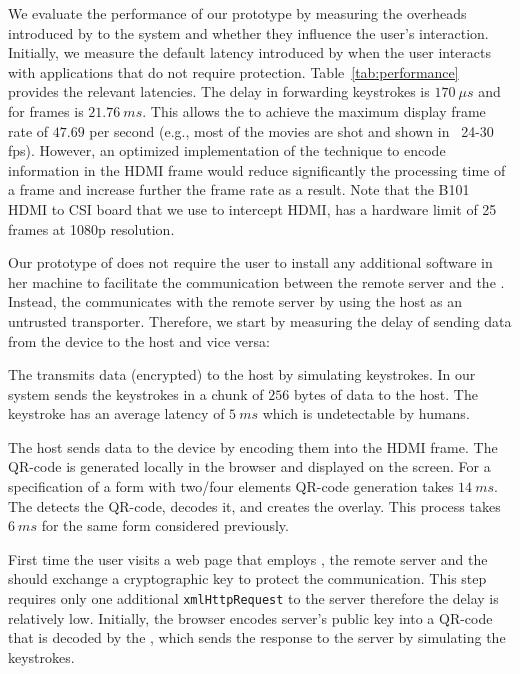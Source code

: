 We evaluate the performance of our prototype by measuring the overheads introduced by \name to the system and whether they influence the user's interaction. Initially, we measure the default latency introduced by \device when the user interacts with applications that do not require protection. Table~\ref{tab:performance} provides the relevant latencies.
The delay in forwarding keystrokes is $170\ \mu s$ and for frames is $21.76\ ms$. This allows the \device to achieve the maximum display frame rate of $47.69$ per second (e.g., most of the movies are shot and shown in  ~24-30 fps). However, an optimized implementation of the technique to encode information in the HDMI frame would reduce significantly the processing time of a frame and increase further the frame rate as a result. Note that the B101 HDMI to CSI board that we use to intercept HDMI, has a hardware limit of 25 frames at 1080p resolution.

Our prototype of \name does not require the user to install any additional software in her machine to facilitate the communication between the remote server and the \device. Instead, the \device communicates with the remote server by using the host as an untrusted transporter. Therefore, we start by measuring the delay of sending data from the device to the host and vice versa:

 The \device transmits data (encrypted) to the host by simulating keystrokes. In our system \device sends the keystrokes in a chunk of $256$ bytes of data to the host. The keystroke has an average latency of $5\ ms$ which is undetectable by humans.  

 The host sends data to the device by encoding them into the HDMI frame. The QR-code is generated locally in the browser and displayed on the screen. For a specification of a form with two/four elements QR-code generation takes $14\ ms$. The \device detects the QR-code, decodes it, and creates the overlay. This process takes $6\ ms$ for the same form considered previously.
 

 First time the user visits a web page that employs \name, the remote server and the \device should exchange a cryptographic key to protect the communication. This step requires only one additional \texttt{xmlHttpRequest} to the server therefore the delay is relatively low. Initially, the browser encodes server's public key into a QR-code that is decoded by the \device, which sends the response to the server by simulating the keystrokes.

